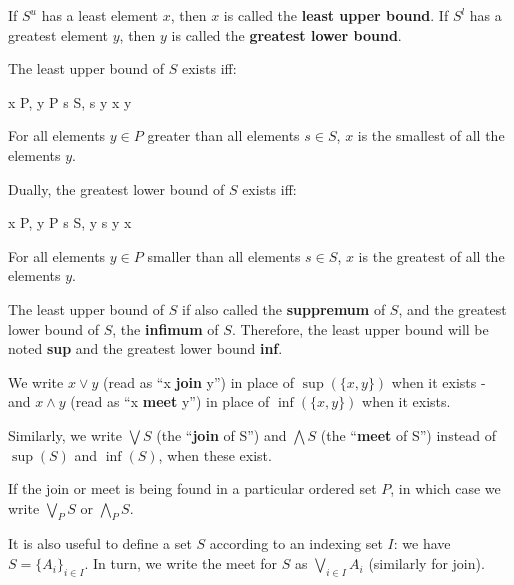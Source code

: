 \begin{definition} If $S^{u}$ has a least
element $x$, then $x$ is called the \textbf{least upper bound}. If $S^{l}$ has a
greatest element $y$, then $y$ is called the \textbf{greatest lower bound}.

The least upper bound of $S$ exists iff:

\begin{quantifiedequation*}{\exists x \in P, \forall y \in P} \forall s \in S, s
\leq y \Leftrightarrow x \leq y
\end{quantifiedequation*}

\begin{remark} For all elements $y \in P$ greater than all elements $s \in S$,
$x$ is the smallest of all the elements $y$.
\end{remark}

Dually, the greatest lower bound of $S$ exists iff:
\begin{quantifiedequation*}{\exists x \in P, \forall y \in P} \forall s \in S, y
\leq s \Leftrightarrow y \leq x
\end{quantifiedequation*}

\begin{remark} For all elements $y \in P$ smaller than all elements $s \in S$,
$x$ is the greatest of all the elements $y$.
\end{remark}

\end{definition}

\begin{remark} The least upper bound of $S$ if also called the
\textbf{suppremum} of $S$, and the greatest lower bound of $S$, the
\textbf{infimum} of $S$. Therefore, the least upper bound will be noted
\textbf{sup} and the greatest lower bound \textbf{inf}.
\end{remark}

\begin{notation} We write $x \lor y$ (read as ``x \textbf{join} y'') in place of
$\sup(\{x,y\})$ when it exists - and $x \land y$ (read as ``x \textbf{meet} y'')
in place of $\inf(\{x,y\})$ when it exists.

Similarly, we write $\bigvee S$ (the ``\textbf{join} of S'') and $\bigwedge S$
(the ``\textbf{meet} of S'') instead of $\sup(S)$ and $\inf(S)$, when these
exist.

If the join or meet is being found in a particular ordered set $P$, in which
case we write $\bigvee_{P}S$ or $\bigwedge_{P}S$.

It is also useful to define a set $S$ according to an indexing set $I$: we have
$S = \{A_i\}_{i \in I}$. In turn, we write the meet for $S$ as $\bigvee_{i \in
I} A_i$ (similarly for join).
\end{notation}

